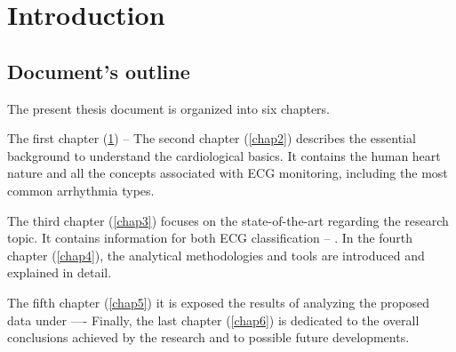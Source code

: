 \chapter{Introduction} \label{chap1}





\section{Document's outline} \label{doc_struct}

The present thesis document is organized into six chapters. 

The first chapter (\ref{chap1}) -- The second chapter (\ref{chap2}) describes the essential background to understand the cardiological basics. It contains the human heart nature and all the concepts associated with ECG monitoring, including the most common arrhythmia types.

The third chapter (\ref{chap3}) focuses on the state-of-the-art regarding the research topic. It contains information for both ECG classification -- . In the fourth chapter (\ref{chap4}), the analytical methodologies and tools are introduced and explained in detail. 

The fifth chapter (\ref{chap5}) it is exposed the results of analyzing the proposed data under  ---- Finally, the last chapter (\ref{chap6}) is dedicated to the overall conclusions achieved by the research and to possible future developments.